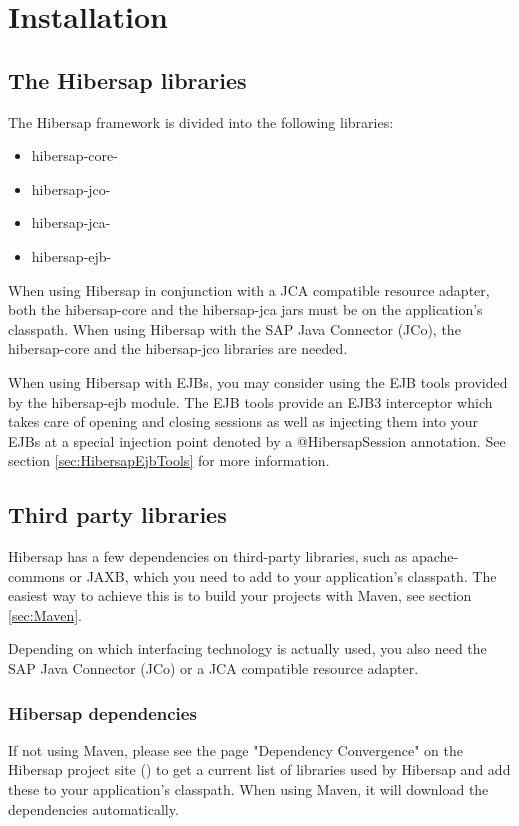 \chapter{Installation}
\label{cha:Installation}

\section{The Hibersap libraries}

The Hibersap framework is divided into the following libraries:
\begin{itemize}
  \item hibersap-core-\HibersapVersion
  \item hibersap-jco-\HibersapVersion
  \item hibersap-jca-\HibersapVersion
  \item hibersap-ejb-\HibersapVersion
\end{itemize}

When using Hibersap in conjunction with a JCA compatible resource adapter, both the hibersap-core and the hibersap-jca jars must be on the application's classpath. When using Hibersap with the SAP Java Connector (JCo), the hibersap-core and the hibersap-jco libraries are needed. 

When using Hibersap with EJBs, you may consider using the EJB tools provided by the hibersap-ejb module. 
The EJB tools provide an EJB3 interceptor which takes care of opening and closing sessions as well as injecting them into your EJBs at a special injection point denoted by a @HibersapSession annotation. See section \ref{sec:HibersapEjbTools} for more information.

\section{Third party libraries}
Hibersap has a few dependencies on third-party libraries, such as apache-commons or JAXB, which you need to add to your application's classpath. The easiest way to achieve this is to build your projects with Maven, see section \ref{sec:Maven}.  

Depending on which interfacing technology is actually used, you also need the SAP Java Connector (JCo) 
or a JCA compatible resource adapter.

\subsection{Hibersap dependencies}
If not using Maven, please see the page "Dependency Convergence" on the Hibersap project site (\urlHibersapSite) to get a current list of libraries used by Hibersap and add these to your application's classpath. When using Maven, it will download the dependencies automatically.


